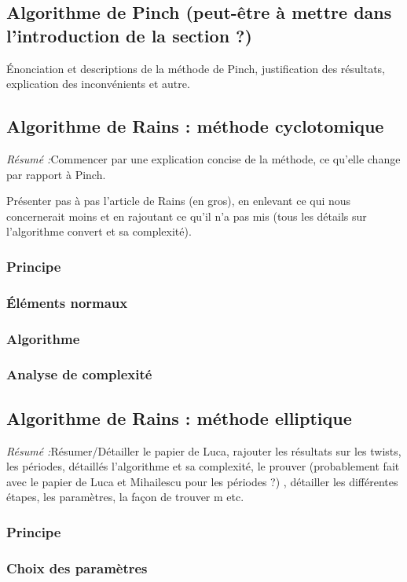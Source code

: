 \documentclass[a4paper]{article} %
\numberwithin{equation}{section}
\begin{document}
\subsection{Algorithme de Pinch (peut-être à mettre dans l'introduction de 
la section ?)}
Énonciation et descriptions de la méthode de Pinch, justification des 
résultats, explication des inconvénients et autre.
\subsection{Algorithme de Rains : méthode cyclotomique}
\textit{Résumé :}Commencer par une explication concise de la méthode, ce 
qu'elle change par rapport à Pinch.\par
Présenter pas à pas l'article de Rains (en gros), en enlevant ce qui nous 
concernerait moins et en rajoutant ce qu'il n'a pas mis (tous les détails 
sur l'algorithme convert et sa complexité).
\subsubsection{Principe}
\subsubsection{Éléments normaux}
\subsubsection{Algorithme}
\subsubsection{Analyse de complexité}
\subsection{Algorithme de Rains : méthode elliptique}
\textit{Résumé :}Résumer/Détailler le papier de Luca, rajouter les résultats sur
les twists, les périodes, détaillés l'algorithme et sa complexité, le prouver 
(probablement fait avec le papier de Luca et Mihailescu pour les périodes ?)
, détailler les différentes étapes, les paramètres, la façon de trouver m 
etc.
\subsubsection{Principe}
\subsubsection{Choix des paramètres}
\end{document}
